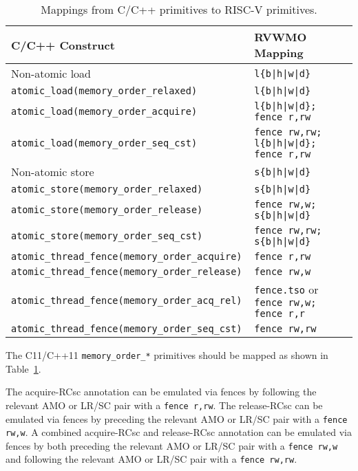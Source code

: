 \begin{table}[h!]
  \begin{tabular}{|l|l|}
    \hline
    C/C++ Construct                            & RVWMO Mapping \\
    \hline
    \hline
    Non-atomic load                            & \tt l\{b|h|w|d\}               \\
    \hline
    \tt atomic\_load(memory\_order\_relaxed)   & \tt l\{b|h|w|d\}               \\
    \hline
    \tt atomic\_load(memory\_order\_acquire)   & \tt l\{b|h|w|d\}; fence r,rw    \\
    \hline
    \tt atomic\_load(memory\_order\_seq\_cst)  & \tt fence rw,rw; l\{b|h|w|d\}; fence r,rw       \\
    \hline
    \hline
    Non-atomic store                           & \tt s\{b|h|w|d\}               \\
    \hline
    \tt atomic\_store(memory\_order\_relaxed)  & \tt s\{b|h|w|d\}               \\
    \hline
    \tt atomic\_store(memory\_order\_release)  & \tt fence rw,w; s\{b|h|w|d\}  \\
    \hline
    \tt atomic\_store(memory\_order\_seq\_cst) & \tt fence rw,rw; s\{b|h|w|d\} \\
    \hline
    \hline
    \tt atomic\_thread\_fence(memory\_order\_acquire)  & \tt fence r,rw \\
    \hline
    \tt atomic\_thread\_fence(memory\_order\_release)  & \tt fence rw,w \\
    \hline
    \tt atomic\_thread\_fence(memory\_order\_acq\_rel) & {\tt fence.tso} or {\tt fence rw,w; fence r,r} \\
    \hline
    \tt atomic\_thread\_fence(memory\_order\_seq\_cst) & \tt fence rw,rw \\
    \hline
  \end{tabular}
  \caption{Mappings from C/C++ primitives to RISC-V primitives.}
  \label{tab:mappings}
\end{table}

The C11/C++11 {\tt memory\_order\_*} primitives should be mapped as shown in Table~\ref{tab:mappings}.

The acquire-RCsc annotation can be emulated via fences by following the relevant AMO or LR/SC pair with a {\tt fence r,rw}.
The release-RCsc can be emulated via fences by preceding the relevant AMO or LR/SC pair with a {\tt fence rw,w}.
A combined acquire-RCsc and release-RCsc annotation can be emulated via fences by both preceding the relevant AMO or LR/SC pair with a {\tt fence rw,w} and following the relevant AMO or LR/SC pair with a {\tt fence rw,rw}.

